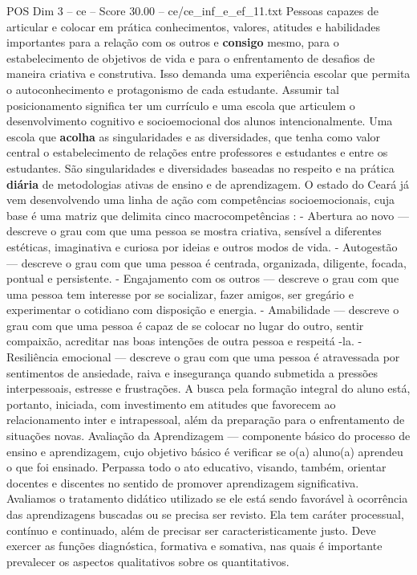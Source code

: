 \begin{textsample}{POS Dim 3 – ce – Score 30.00 – ce/ce\_inf\_e\_ef\_11.txt}
Pessoas capazes de articular e colocar em prática conhecimentos, valores, atitudes e habilidades importantes para a relação com os outros e \textbf{consigo} mesmo, para o estabelecimento de objetivos de vida e para o enfrentamento de desafios de maneira criativa e construtiva.
Isso demanda uma experiência escolar que permita o autoconhecimento e protagonismo de cada estudante.
Assumir tal posicionamento significa ter um currículo e uma escola que articulem o desenvolvimento cognitivo e socioemocional dos alunos intencionalmente.
Uma escola que \textbf{acolha} as singularidades e as diversidades, que tenha como valor central o estabelecimento de relações entre professores e estudantes e entre os estudantes.
São singularidades e diversidades baseadas no respeito e na prática \textbf{diária} de metodologias ativas de ensino e de aprendizagem.
O estado do Ceará já vem desenvolvendo uma linha de ação com competências socioemocionais, cuja base é uma matriz que delimita cinco macrocompetências : - Abertura ao novo — descreve o grau com que uma pessoa se mostra criativa, sensível a diferentes estéticas, imaginativa e curiosa por ideias e outros modos de vida. - Autogestão — descreve o grau com que uma pessoa é centrada, organizada, diligente, focada, pontual e persistente. - Engajamento com os outros — descreve o grau com que uma pessoa tem interesse por se socializar, fazer amigos, ser gregário e experimentar o cotidiano com disposição e energia. - Amabilidade — descreve o grau com que uma pessoa é capaz de se colocar no lugar do outro, sentir compaixão, acreditar nas boas intenções de outra pessoa e respeitá -la. - Resiliência emocional — descreve o grau com que uma pessoa é atravessada por sentimentos de ansiedade, raiva e insegurança quando submetida a pressões interpessoais, estresse e frustrações.
A busca pela formação integral do aluno está, portanto, iniciada, com investimento em atitudes que favorecem ao relacionamento inter e intrapessoal, além da preparação para o enfrentamento de situações novas.
Avaliação da Aprendizagem — componente básico do processo de ensino e aprendizagem, cujo objetivo básico é verificar se o(a) aluno(a) aprendeu o que foi ensinado.
Perpassa todo o ato educativo, visando, também, orientar docentes e discentes no sentido de promover aprendizagem significativa.
Avaliamos o tratamento didático utilizado se ele está sendo favorável à ocorrência das aprendizagens buscadas ou se precisa ser revisto.
Ela tem caráter processual, contínuo e continuado, além de precisar ser caracteristicamente justo.
Deve exercer as funções diagnóstica, formativa e somativa, nas quais é importante prevalecer os aspectos qualitativos sobre os quantitativos.

\end{textsample}
